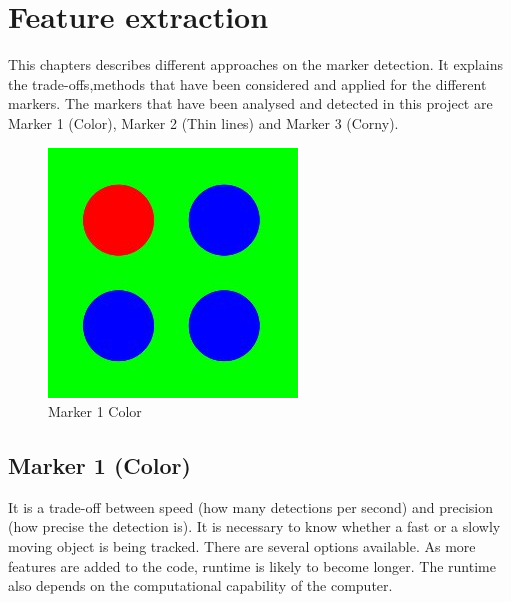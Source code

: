 \chapter{Feature extraction} %
\label{chap:feature_extraction}
This chapters describes different approaches on the marker detection. It explains the trade-offs,methods that have been considered and applied for the different markers. The markers that have been analysed and detected in this project are Marker 1 (Color), Marker 2 (Thin lines) and Marker 3 (Corny). 

\begin{figure}[ht!]
	\centering
	\includegraphics[width=\textwidth]{figures/Marker1png.png}
	\caption{Marker 1 Color}
	\label{fig:markerColor}
\end{figure}
\section{Marker 1 (Color)} 
It is a trade-off between speed (how many detections per second) and precision (how precise the detection is). It is necessary to know whether a fast or a slowly moving object is being tracked. There are several options available. As more features are added to the code, runtime is likely to become longer. The runtime also depends on the computational capability of the computer.

